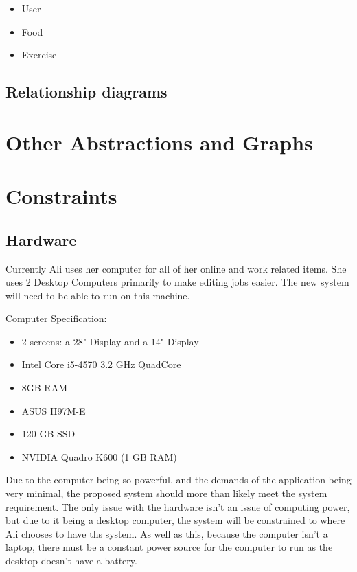 \begin{itemize}
\item User
\item Food
\item Exercise
\end{itemize}

\subsection{Relationship diagrams}

\section{Other Abstractions and Graphs}


\section{Constraints}

\subsection{Hardware}
Currently Ali uses her computer for all of her online and work related items. She uses 2 Desktop Computers primarily to make editing jobs easier. The new system will need to be able to run on this machine.

Computer Specification:

\begin{itemize}
\item 2 screens: a 28" Display and a 14" Display
\item Intel Core i5-4570 3.2 GHz QuadCore
\item 8GB RAM
\item ASUS H97M-E
\item 120 GB SSD
\item NVIDIA Quadro K600 (1 GB RAM)
\end{itemize}

Due to the computer being so powerful, and the demands of the application being very minimal, the proposed system should more than likely meet the system requirement. The only issue with the hardware isn't an issue of computing power, but due to it being a desktop computer, the system will be constrained to where Ali chooses to have ths system. As well as this, because the computer isn't a laptop, there must be a constant power source for the computer to run as the desktop doesn't have a battery.

